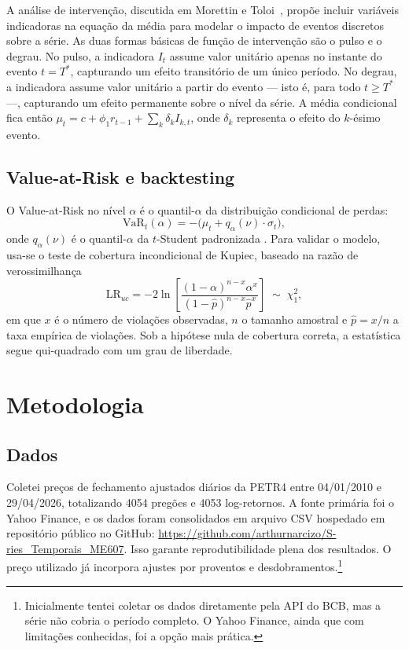 \documentclass[12pt, a4paper]{article}
\begin{document}
A análise de intervenção, discutida em Morettin e Toloi~\cite{morettin2020}, propõe incluir variáveis indicadoras na equação da média para modelar o impacto de eventos discretos sobre a série. As duas formas básicas de função de intervenção são o pulso e o degrau. No pulso, a indicadora $I_t$ assume valor unitário apenas no instante do evento $t = T^*$, capturando um efeito transitório de um único período. No degrau, a indicadora assume valor unitário a partir do evento --- isto é, para todo $t \geq T^*$ ---, capturando um efeito permanente sobre o nível da série. A média condicional fica então $\mu_t = c + \phi_1 r_{t-1} + \sum_k \delta_k I_{k,t}$, onde $\delta_k$ representa o efeito do $k$-ésimo evento.

\subsection{Value-at-Risk e backtesting}

O Value-at-Risk no nível $\alpha$ é o quantil-$\alpha$ da distribuição condicional de perdas:
\begin{equation}
    \mathrm{VaR}_t(\alpha) = -\big( \mu_t + q_\alpha(\nu) \cdot \sigma_t \big),
\end{equation}
onde $q_\alpha(\nu)$ é o quantil-$\alpha$ da $t$-Student padronizada \cite{morettin2017}. Para validar o modelo, usa-se o teste de cobertura incondicional de Kupiec, baseado na razão de verossimilhança
\begin{equation}
    \mathrm{LR}_{uc} = -2 \ln\!\left[ \frac{(1-\alpha)^{n-x} \alpha^x}{(1-\hat{p})^{n-x} \hat{p}^x} \right] \;\sim\; \chi^2_1,
\end{equation}
em que $x$ é o número de violações observadas, $n$ o tamanho amostral e $\hat{p} = x/n$ a taxa empírica de violações. Sob a hipótese nula de cobertura correta, a estatística segue qui-quadrado com um grau de liberdade.

\section{Metodologia}
\label{sec:metodo}

\subsection{Dados}

Coletei preços de fechamento ajustados diários da PETR4 entre 04/01/2010 e 29/04/2026, totalizando 4054 pregões e 4053 log-retornos. A fonte primária foi o Yahoo Finance, e os dados foram consolidados em arquivo CSV hospedado em repositório público no GitHub: \url{https://github.com/arthurnarcizo/S-ries_Temporais_ME607}. Isso garante reprodutibilidade plena dos resultados. O preço utilizado já incorpora ajustes por proventos e desdobramentos.\footnote{Inicialmente tentei coletar os dados diretamente pela API do BCB, mas a série não cobria o período completo. O Yahoo Finance, ainda que com limitações conhecidas, foi a opção mais prática.}
\end{document}
